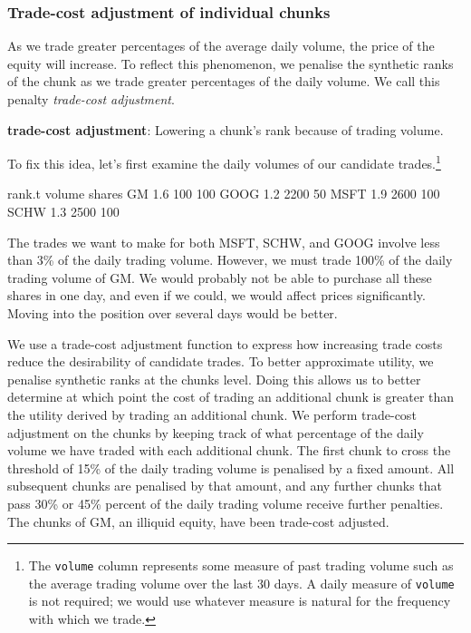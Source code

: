 \documentclass{article}
\begin{document}
\subsubsection{Trade-cost adjustment of individual chunks}

As we trade greater percentages of the average daily volume, the price
of the equity will increase.  To reflect this phenomenon, we penalise
the synthetic ranks of the chunk as we trade greater percentages of
the daily volume.  We call this penalty \emph{trade-cost adjustment}.

\begin{description}

\item{\bf{trade-cost adjustment}}: Lowering a chunk's rank because of
trading volume.

\end{description}

To fix this idea, let's first examine the daily volumes of our
candidate trades.\protect\footnote{The \texttt{volume} column
represents some measure of past trading volume such as the average
trading volume over the last 30 days.  A daily measure of
\texttt{volume} is not required; we would use whatever measure is
natural for the frequency with which we trade.}

\begin{Schunk}
\begin{Soutput}
     rank.t volume shares
GM      1.6    100    100
GOOG    1.2   2200     50
MSFT    1.9   2600    100
SCHW    1.3   2500    100
\end{Soutput}
\end{Schunk}

The trades we want to make for both MSFT, SCHW, and GOOG involve less
than 3\% of the daily trading volume.  However, we must trade 100\% of
the daily trading volume of GM.  We would probably not be able to
purchase all these shares in one day, and even if we could, we would
affect prices significantly.  Moving into the position over several
days would be better.

We use a trade-cost adjustment function to express how increasing
trade costs reduce the desirability of candidate trades.  To better
approximate utility, we penalise synthetic ranks at the chunks level.
Doing this allows us to better determine at which point the cost of
trading an additional chunk is greater than the utility derived by
trading an additional chunk.  We perform trade-cost adjustment on the
chunks by keeping track of what percentage of the daily volume we have
traded with each additional chunk.  The first chunk to cross the
threshold of 15\% of the daily trading volume is penalised by a fixed
amount.  All subsequent chunks are penalised by that amount, and any
further chunks that pass 30\% or 45\% percent of the daily trading
volume receive further penalties.  The chunks of GM, an illiquid
equity, have been trade-cost adjusted.
\end{document}
